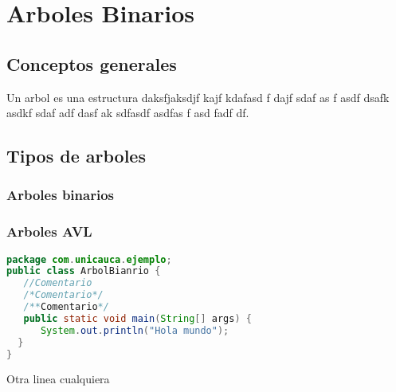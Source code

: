 \chapter{Arboles Binarios}

\section{Conceptos generales}
Un arbol es una estructura daksfjaksdjf kajf kdafasd
f dajf sdaf as
f asdf dsafk asdkf sdaf adf dasf  ak sdfasdf asdfas f
asd fadf 
df.


\section{Tipos de arboles}

\subsection{Arboles binarios}

\subsection{Arboles AVL}

\begin{lstlisting}[language=Java]
package com.unicauca.ejemplo;
public class ArbolBianrio {
   //Comentario
   /*Comentario*/
   /**Comentario*/
   public static void main(String[] args) {
      System.out.println("Hola mundo");
  }
}
\end{lstlisting}

Otra linea cualquiera